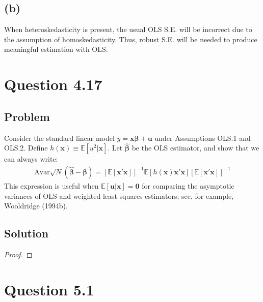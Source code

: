 \documentclass[10pt, a4paper]{article}
\begin{document}
    \subsection*{(b)}
      When heteroskedasticity is present, the usual OLS S.E. will be incorrect due to the assumption of homoskedasticity. Thus, robust S.E. will be needed to produce meaningful estimation with OLS.
\section*{Question 4.17}
  \subsection*{Problem}
    Consider the standard linear model $y = \boldsymbol{x}\boldsymbol{\beta} + \boldsymbol{u}$ under Assumptions OLS.1 and OLS.2. Define $h(\boldsymbol{x}) \equiv \mathbb{E}[u^2 | \boldsymbol{x}]$. Let $\hat{\boldsymbol{\beta}}$ be the OLS estimator, and show that we can always write:
    \begin{align}
    \text{Avar}\sqrt{N}(\hat{\boldsymbol{\beta}} - \boldsymbol{\beta}) = \left[\mathbb{E}[\boldsymbol{x}'\boldsymbol{x}]\right]^{-1} \mathbb{E}[h(\boldsymbol{x})\boldsymbol{x}'\boldsymbol{x}]\left[\mathbb{E}[\boldsymbol{x}'\boldsymbol{x}]\right]^{-1}
    \end{align}
    This expression is useful when $\mathbb{E}[\boldsymbol{u} | \boldsymbol{x}] = \boldsymbol{0}$ for comparing the asymptotic variances of OLS and weighted least squares estimators; see, for example, Wooldridge (1994b).
  \subsection*{Solution}
    \begin{proof}
    \end{proof}
\section*{Question 5.1}
\end{document}
